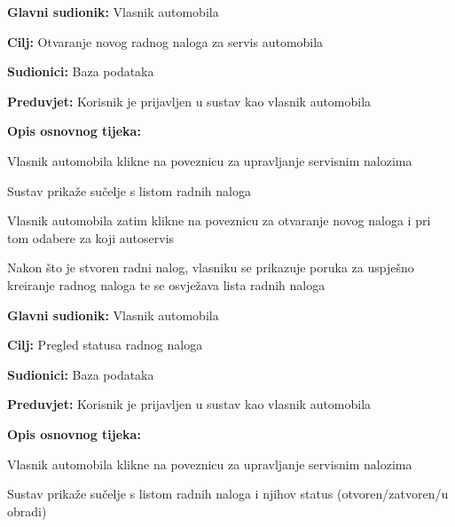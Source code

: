 \noindent {}
\begin{packed_item}
	
	\item \textbf{Glavni sudionik: } Vlasnik automobila
	\item  \textbf{Cilj:} Otvaranje novog radnog naloga za servis automobila
	\item  \textbf{Sudionici:} Baza podataka
	\item  \textbf{Preduvjet:} Korisnik je prijavljen u sustav kao vlasnik automobila
	\item  \textbf{Opis osnovnog tijeka:}
	
	\item[] \begin{packed_enum}
		
		\item Vlasnik automobila klikne na poveznicu za upravljanje servisnim nalozima
		\item Sustav prikaže sučelje s listom radnih naloga
		\item Vlasnik automobila zatim klikne na poveznicu za otvaranje novog naloga i pri
		tom odabere za koji autoservis
		\item Nakon što je stvoren radni nalog, vlasniku se prikazuje poruka za
		uspješno kreiranje radnog naloga te se osvježava lista radnih naloga
		
	\end{packed_enum}
\end{packed_item}

\noindent {}
\begin{packed_item}
	
	\item \textbf{Glavni sudionik: } Vlasnik automobila
	\item  \textbf{Cilj:} Pregled statusa radnog naloga
	\item  \textbf{Sudionici:} Baza podataka
	\item  \textbf{Preduvjet:} Korisnik je prijavljen u sustav kao vlasnik automobila
	\item  \textbf{Opis osnovnog tijeka:}
	
	\item[] \begin{packed_enum}
		
		\item Vlasnik automobila klikne na poveznicu za upravljanje servisnim nalozima
		\item Sustav prikaže sučelje s listom radnih naloga i njihov status
		(otvoren/zatvoren/u obradi)
		
	\end{packed_enum}
\end{packed_item}

